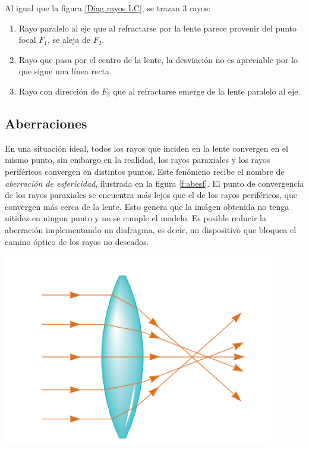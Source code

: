 \documentclass[a4paper,12pt]{article}
\newenvironment{Figure}
  {\par\medskip\noindent\minipage{\linewidth}}
  {\endminipage\par\medskip}
\begin{document}
\begin{multicols*}{2}
        Al igual que la figura \ref{Diag rayos LC}, se trazan 3 rayos:

        \begin{enumerate}
            \item Rayo paralelo al eje que al refractarse por la lente parece provenir del punto focal $F_{1}$, se aleja de $F_{2}$.
            \item Rayo que pasa por el centro de la lente, la desviación no es apreciable por lo que sigue una línea recta.
            \item Rayo con dirección de $F_{2}$ que al refractarse emerge de la lente paralelo al eje.
        \end{enumerate}

    \subsection*{Aberraciones}

        En una situación ideal, todos los rayos que inciden en la lente convergen en el mismo punto, sin embargo en la realidad, los rayos paraxiales y los rayos periféricos convergen en distintos puntos. Este fenómeno recibe el nombre de \emph{aberración de esfericidad}, ilustrada en la figura \ref{f:abesf}. El punto de convergencia de los rayos paraxiales se encuentra más lejos que el de los rayos periféricos, que convergen más cerca de la lente. Esto genera que la imágen obtenida no tenga nitidez en ningun punto y no se cumple el modelo. Es posible reducir la aberración implementando un diafragma, es decir, un dispositivo que bloquea el camino óptico de los rayos no deseados.

        \begin{Figure}
            \centering
            \includegraphics[width=0.7\linewidth]{AberracionEsferica.png}
            \label{f:abesf}
        \end{Figure}


\end{multicols*}
\end{document}
